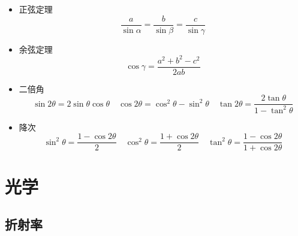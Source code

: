 \documentclass{article}
\begin{document}
\begin{formal}
\begin{itemize}
        \item 正弦定理
              $$ \dfrac{a}{\sin{\alpha}} = \dfrac{b}{\sin{\beta}} = \dfrac{c}{\sin{\gamma}}   $$

        \item 余弦定理
              $$ \cos{\gamma} = \dfrac{a^{2}+b^{2} - c^{2}}{2ab} $$

        \item 二倍角
              $$ \sin{2\theta} = 2\sin{\theta}\cos{\theta} \quad \cos{2\theta} = \cos^{2}{\theta} - \sin^{2}{\theta} \quad \tan{2\theta} = \dfrac{2\tan{\theta}}{1-\tan^{2}{\theta}}$$

        \item 降次
              $$ \sin^{2}{\theta} = \dfrac{1 - \cos{2\theta}}{2} \quad \cos^{2}{\theta} = \dfrac{1 + \cos{2\theta}}{2} \quad \tan^{2}{\theta} = \dfrac{1-\cos{2\theta}}{1+\cos{2\theta}}$$
    \end{itemize}
\end{formal}

\vspace{2em}

\vspace{2em}

\section{光学}
\subsection{折射率}
\end{document}
